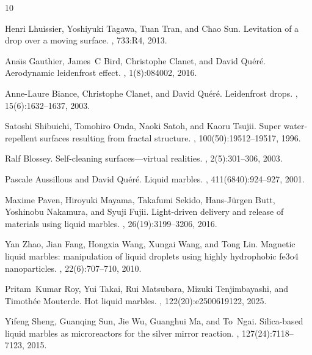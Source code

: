 \documentclass[twocolumn, prl,
 amsmath,amssymb,
 superscriptaddress,aps,
]{revtex4-2}
\begin{document}
\begin{thebibliography}{10}

	Henri Lhuissier, Yoshiyuki Tagawa, Tuan Tran, and Chao Sun.
	\newblock Levitation of a drop over a moving surface.
	, 733:R4, 2013.

	Ana{\"\i}s Gauthier, James~C Bird, Christophe Clanet, and David Qu{\'e}r{\'e}.
	\newblock Aerodynamic leidenfrost effect.
	, 1(8):084002, 2016.

	Anne-Laure Biance, Christophe Clanet, and David Qu{\'e}r{\'e}.
	\newblock Leidenfrost drops.
	, 15(6):1632--1637, 2003.

	Satoshi Shibuichi, Tomohiro Onda, Naoki Satoh, and Kaoru Tsujii.
	\newblock Super water-repellent surfaces resulting from fractal structure.
	, 100(50):19512--19517, 1996.

	Ralf Blossey.
	\newblock Self-cleaning surfaces—virtual realities.
	, 2(5):301--306, 2003.

	Pascale Aussillous and David Qu{\'e}r{\'e}.
	\newblock Liquid marbles.
	, 411(6840):924--927, 2001.

	Maxime Paven, Hiroyuki Mayama, Takafumi Sekido, Hans-J{\"u}rgen Butt, Yoshinobu
	Nakamura, and Syuji Fujii.
	\newblock Light-driven delivery and release of materials using liquid marbles.
	, 26(19):3199--3206, 2016.

	Yan Zhao, Jian Fang, Hongxia Wang, Xungai Wang, and Tong Lin.
	\newblock Magnetic liquid marbles: manipulation of liquid droplets using highly
	hydrophobic fe3o4 nanoparticles.
	, 22(6):707--710, 2010.

	Pritam~Kumar Roy, Yui Takai, Rui Matsubara, Mizuki Tenjimbayashi, and
	Timoth{\'e}e Mouterde.
	\newblock Hot liquid marbles.
	,
	122(20):e2500619122, 2025.

	Yifeng Sheng, Guanqing Sun, Jie Wu, Guanghui Ma, and To~Ngai.
	\newblock Silica-based liquid marbles as microreactors for the silver mirror
	reaction.
	, 127(24):7118--7123, 2015.


\end{thebibliography}
\end{document}
